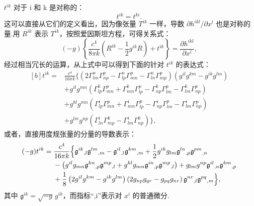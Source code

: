 $t^{ik}$ 对于 i 和 k 是对称的：
\begin{equation}
  t^{ik}=t^{ki}.
\end{equation}
这可以直接从它们的定义看出，因为像张量 $T^{ik}$ 一样，导数 $\partial h^{ikl}/\partial x^l$ 也是对称的量.用 $R^{ik}$ 表示 $T^{ik}$，按照爱因斯坦方程，可得关系式：
\begin{equation}
  (-g)\left\{\frac{c^4}{8\pi k}\left(R^{ik}-\frac{1}{2}g^{ik}R\right)
  +t^{ik}\right\}=\frac{\partial h^{ikl}}{\partial x^l},
\end{equation}
经过相当冗长的运算，从上式中可以得到下面的针对 $t^{ik}$ 的表达式：
\begin{equation}
\begin{aligned}[b]
  t^{ik}={}&\frac{c^4}{16\pi k}\bigl\{
  \left(2\Gamma^n_{lm}\Gamma^p_{np}
  -\Gamma^n_{lp}\Gamma^p_{mn}
  -\Gamma^n_{ln}\Gamma^p_{mp}\right)
  \left(g^{il}g^{km}-g^{ik}g^{lm}\right)\\
  &+g^{il}g^{mn}\left(\Gamma^k_{lp}\Gamma^p_{mn}
  +\Gamma^k_{mn}\Gamma^p_{lp}
  -\Gamma^k_{np}\Gamma^p_{lm}
  -\Gamma^k_{lm}\Gamma^p_{np}\right)\\
  &+g^{kl}g^{mn}\left(\Gamma^i_{lp}\Gamma^p_{mn}
  +\Gamma^i_{mn}\Gamma^p_{lp}
  -\Gamma^i_{np}\Gamma^p_{lm}
  -\Gamma^i_{lm}\Gamma^p_{np}\right)\\
  &+g^{lm}g^{np}\left(\Gamma^i_{ln}\Gamma^k_{mp}
  -\Gamma^i_{lm}\Gamma^k_{np}\right)\bigr\},
\end{aligned}
\end{equation}
或者，直接用度规张量的分量的导数表示：
\begin{equation}
\begin{aligned}[b]
  (-g)t^{ik}={}&\frac{c^4}{16\pi k}\Bigl\{
  \mathfrak{g}^{ik}{}_{,l}\mathfrak{g}^{lm}{}_{,m}
  -\mathfrak{g}^{il}{}_{,l}\mathfrak{g}^{km}{}_{,m}
  +\frac{1}{2}g^{ik}g_{lm}\mathfrak{g}^{ln}{}_{,p}
  \mathfrak{g}^{pm}{}_{,n}\\
  &-\left(g^{il}g_{mn}\mathfrak{g}^{kn}{}_{,p}\mathfrak{g}^{mp}{}_{,l}
  +g^{kl}g_{mn}\mathfrak{g}^{in}{}_{,p}\mathfrak{g}^{mp}{}_{,l}\right)
  +g_{lm}g^{np}\mathfrak{g}^{il}{}_{,n}\mathfrak{g}^{km}{}_{,p}\\
  &+\frac{1}{8}\left(2g^{il}g^{km}-g^{ik}g^{lm}\right)
  \left(2g_{np}g_{qr}-g_{pq}g_{nr}\right)
  \mathfrak{g}^{nr}{}_{,l}\mathfrak{g}^{pq}{}_{,m}\Bigr\},
\end{aligned}
\end{equation}
其中 $\mathfrak{g}^{ik}=\sqrt{-g}\,g^{ik}$，而指标“,i”表示对 $x^i$ 的普通微分.

